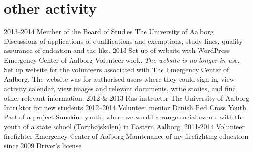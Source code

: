 \documentclass[]{friggeri-cv}
\begin{document}
\section{other activity}

\begin{entrylist}
  \entry
  {2013–2014}
  {Member of the Board of Studies}
  {The University of Aalborg}
  {Discussions of applications of qualifications and exemptions, study lines, quality assurance of eudcation and the like.}
  \entry
  {2013}
  {Set up of website with WordPress}
  {Emergency Center of Aalborg}
  {Volunteer work.
  \textit{The website is no longer in use.}
  Set up website for the volunteers associated with The Emergency Center of Aalborg.
  The website was for authorised users where they could sign in, view activity calendar, view images and relevant documents, write stories, and find other relevant information.
  }
  \entry
  {2012 \& 2013}
  {Rus-instructor}
  {The University of Aalborg}
  {Intruktor for new students}
  \entry
  {2012–2014}
  {Volunteer mentor}
  {Danish Red Cross Youth}
  {Part of a project \href{http://www.urk.dk/solskinsunge/}{Sunshine youth}, where we would arrange social events with the youth of a state school (Tornhøjskolen) in Eastern Aalborg.}
  \entry
  {2011-2014}
  {Volunteer firefighter}
  {Emergency Center of Aalborg}
  {Maintenance of my firefighting education}
  \entry
  {since 2009}
  {Driver's license}
  {}{}
\end{entrylist}
\end{document}
